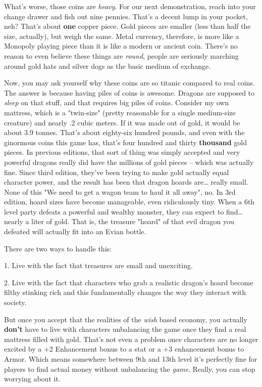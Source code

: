 What's worse, those coins are \textit{heavy}. For our next demonstration, reach into your change drawer and fish out nine pennies. That's a decent lump in your pocket, neh? That's about \textbf{one} copper piece. Gold pieces are smaller (less than half the size, actually), but weigh the same. Metal currency, therefore, is more like a Monopoly playing piece than it is like a modern or ancient coin. There's no reason to even believe these things are \textit{round}, people are seriously marching around gold hats and silver dogs as the basic medium of exchange.

Now, you may ask yourself why these coins are so titanic compared to real coins. The answer is because having piles of coins is awesome. Dragons are supposed to \textit{sleep} on that stuff, and that requires big piles of coins. Consider my own mattress, which is a "twin-size" (pretty reasonable for a single medium-size creature) and nearly .2 cubic meters. If it was made out of gold, it would be about 3.9 tonnes. That's about eighty-six hundred pounds, and even with the ginormous coins this game has, that's four hundred and thirty \textbf{thousand} gold pieces. In previous editions, that sort of thing was simply accepted and very powerful dragons really did have the millions of gold pieces -- which was actually fine. Since third edition, they've been trying to make gold actually equal character power, and the result has been that dragon hoards are\ldots{} really small. None of this "We need to get a wagon team to haul it all away", no. In 3rd edition, hoard sizes have become manageable, even ridiculously tiny. When a 6th level party defeats a powerful and wealthy monster, they can expect to find\ldots{} nearly a liter of gold. That is, the treasure "hoard" of that evil dragon you defeated will actually fit into an Evian bottle.

There are two ways to handle this:

1. Live with the fact that treasures are small and unexciting.

2. Live with the fact that characters who grab a realistic dragon's hoard become filthy stinking rich and this fundamentally changes the way they interact with society.

But once you accept that the realities of the \textit{wish} based economy, you actually \textbf{don't} have to live with characters unbalancing the game once they find a real mattress filled with gold. That's not even a problem once characters are no longer excited by a +2 Enhancement bonus to a stat or a +3 enhancement bonus to Armor. Which means somewhere between 9th and 13th level it's perfectly fine for players to find actual money without unbalancing the \textit{game}. Really, you can stop worrying about it.

